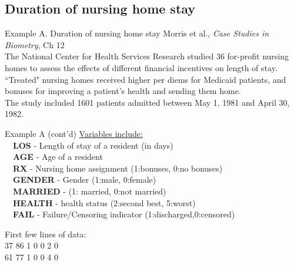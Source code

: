 \documentclass[envcountsect, 10pt, portrait, palatino]{beamer}
\begin{document}
\subsection{Duration of nursing home stay}
\begin{frame}{Example A. Duration of nursing home stay}
Morris et al., {\em Case Studies in Biometry}, Ch 12
\\[2ex]
The National Center for Health Services Research studied 36
for-profit nursing homes to assess the effects of
different financial incentives on length of stay. \\[2ex] 
``Treated" nursing homes received higher per diems for Medicaid patients,
and bonuses for improving a patient's health and sending them home.
\\[2ex]
The study included 1601 patients admitted between May 1, 1981 and
April 30, 1982.
\end{frame}
\begin{frame}{Example A (cont'd)}
\underline{Variables include:} \\
~~{\bf LOS} - Length of stay of a resident (in days)\\
~~{\bf AGE} - Age of a resident\\
~~{\bf RX} - Nursing home assignment (1:bonuses, 0:no bonuses)\\
~~{\bf GENDER} - Gender (1:male, 0:female)\\
~~{\bf MARRIED} - (1: married, 0:not married)\\
~~{\bf HEALTH} - health status (2:second best, 5:worst)\\
~~{\bf FAIL} - Failure/Censoring indicator (1:discharged,0:censored)

First few lines of data: \\
37 86 1 0 0 2 0\\
61 77 1 0 0 4 0\\
\end{frame}
\end{document}
